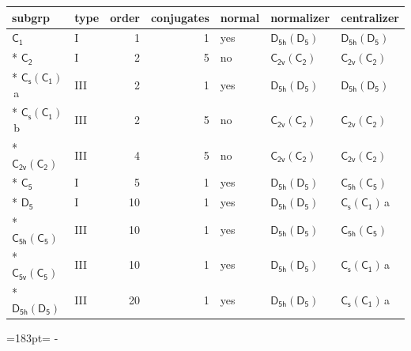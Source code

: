 \documentclass[10pt,a4paper]{article}
\newcommand{\needspace}[1]{\par\penalty-100\begingroup\dimen0=#1\relax\dimen2=\pagegoal
  \advance\dimen2-\pagetotal\ifdim\dimen0>\dimen2\relax\ifdim\dimen2>0pt\vfil\break\fi\fi
  \endgroup}
\numberwithin{equation}{section}
\newcommand{\grp}[1]{\mathsf{#1}}
\newcommand{\clsletter}[1]{\,{\scriptsize\color{black!55}#1}}
\begin{document}
{\small\begin{longtable}{@{}llrrlll@{}}\toprule
subgrp & type & order & conjugates & normal & normalizer & centralizer\\\midrule\endhead
\bottomrule\endfoot\endlastfoot
\href{../../../rotation/data/pdf/C1.pdf}{$\grp{C_{1}}$} & I & 1 & 1 & yes & \href{D5h-D5.pdf}{$\grp{D_{5h}}(\grp{D_{5}})$} & \href{D5h-D5.pdf}{$\grp{D_{5h}}(\grp{D_{5}})$}\\*
\href{../../../rotation/data/pdf/C2.pdf}{$\grp{C_{2}}$} & I & 2 & 5 & no & \href{C2v-C2.pdf}{$\grp{C_{2v}}(\grp{C_{2}})$} & \href{C2v-C2.pdf}{$\grp{C_{2v}}(\grp{C_{2}})$}\\*
\href{C1v-C1.pdf}{$\grp{C_{s}}(\grp{C_{1}})$}\clsletter{a} & III & 2 & 1 & yes & \href{D5h-D5.pdf}{$\grp{D_{5h}}(\grp{D_{5}})$} & \href{D5h-D5.pdf}{$\grp{D_{5h}}(\grp{D_{5}})$}\\*
\href{C1v-C1.pdf}{$\grp{C_{s}}(\grp{C_{1}})$}\clsletter{b} & III & 2 & 5 & no & \href{C2v-C2.pdf}{$\grp{C_{2v}}(\grp{C_{2}})$} & \href{C2v-C2.pdf}{$\grp{C_{2v}}(\grp{C_{2}})$}\\*
\href{C2v-C2.pdf}{$\grp{C_{2v}}(\grp{C_{2}})$} & III & 4 & 5 & no & \href{C2v-C2.pdf}{$\grp{C_{2v}}(\grp{C_{2}})$} & \href{C2v-C2.pdf}{$\grp{C_{2v}}(\grp{C_{2}})$}\\*
\href{../../../rotation/data/pdf/C5.pdf}{$\grp{C_{5}}$} & I & 5 & 1 & yes & \href{D5h-D5.pdf}{$\grp{D_{5h}}(\grp{D_{5}})$} & \href{C5h-C5.pdf}{$\grp{C_{5h}}(\grp{C_{5}})$}\\*
\href{../../../rotation/data/pdf/D5.pdf}{$\grp{D_{5}}$} & I & 10 & 1 & yes & \href{D5h-D5.pdf}{$\grp{D_{5h}}(\grp{D_{5}})$} & \href{C1v-C1.pdf}{$\grp{C_{s}}(\grp{C_{1}})$}\clsletter{a}\\*
\href{C5h-C5.pdf}{$\grp{C_{5h}}(\grp{C_{5}})$} & III & 10 & 1 & yes & \href{D5h-D5.pdf}{$\grp{D_{5h}}(\grp{D_{5}})$} & \href{C5h-C5.pdf}{$\grp{C_{5h}}(\grp{C_{5}})$}\\*
\href{C5v-C5.pdf}{$\grp{C_{5v}}(\grp{C_{5}})$} & III & 10 & 1 & yes & \href{D5h-D5.pdf}{$\grp{D_{5h}}(\grp{D_{5}})$} & \href{C1v-C1.pdf}{$\grp{C_{s}}(\grp{C_{1}})$}\clsletter{a}\\*
\href{D5h-D5.pdf}{$\grp{D_{5h}}(\grp{D_{5}})$} & III & 20 & 1 & yes & \href{D5h-D5.pdf}{$\grp{D_{5h}}(\grp{D_{5}})$} & \href{C1v-C1.pdf}{$\grp{C_{s}}(\grp{C_{1}})$}\clsletter{a}\\
\bottomrule\end{longtable}}
\needspace{183pt}
\end{document}
